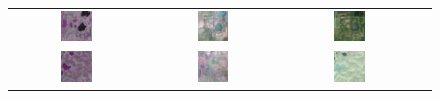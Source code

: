 \vspace{2em} 

\begin{figure}[h!]
    \centering
    \setlength{\tabcolsep}{2pt}
    \renewcommand{\arraystretch}{1.0}
    \begin{tabular}{c *{3}{c}}

        \includegraphics[width=0.25\textwidth]{img/seasons/summer/sample_000004_sar_pseudo.png} &
        \includegraphics[width=0.25\textwidth]{img/seasons/summer/sample_000004_pred_rgb.png} &
        \includegraphics[width=0.25\textwidth]{img/seasons/summer/sample_000004_true_rgb.png} \\
        
        \includegraphics[width=0.25\textwidth]{img/seasons/summer/sample_000017_sar_pseudo.png} &
        \includegraphics[width=0.25\textwidth]{img/seasons/summer/sample_000017_pred_rgb.png} &
        \includegraphics[width=0.25\textwidth]{img/seasons/summer/sample_000017_true_rgb.png} \\
        

\end{tabular}
\end{figure}

